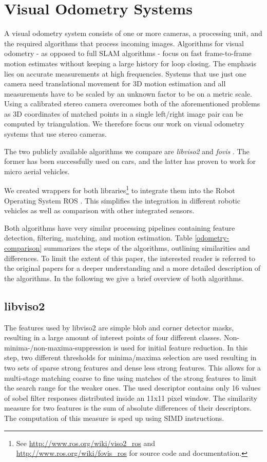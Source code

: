 \documentclass[conference]{IEEEtran}
\begin{document}
\section{Visual Odometry Systems
  \label{visual-odometry-systems}
}
A visual odometry system consists of one or more cameras, a processing unit, and the required algorithms that process incoming images.
Algorithms for visual odometry - as opposed to full SLAM algorithms - focus on fast frame-to-frame motion estimates without keeping a large history for loop closing. The emphasis lies on accurate measurements at high frequencies. Systems that use just one camera need translational movement for 3D motion estimation and all measurements have to be scaled by an unknown factor to be on a metric scale. Using a calibrated stereo camera overcomes both of the aforementioned problems as 3D coordinates of matched points in a single left/right image pair can be computed by triangulation. We therefore focus our work on visual odometry systems that use stereo cameras.

The two publicly available algorithms we compare are \emph{libviso2} \cite{Geiger2011} and \emph{fovis} \cite{Huang2011}. The former has been successfully used on cars, and the latter has proven to work for micro aerial vehicles.

We created wrappers for both libraries\footnote{See \url{http://www.ros.org/wiki/viso2_ros} and \url{http://www.ros.org/wiki/fovis_ros} for source code and documentation.} to integrate them into the Robot Operating System ROS \cite{Quigley2009}. This simplifies the integration in different robotic vehicles as well as comparison with other integrated sensors.


Both algorithms have very similar processing pipelines containing feature detection, filtering, matching, and motion estimation. Table \ref{odometry-comparison} summarizes the steps of the algorithms, outlining similarities and differences. To limit the extent of this paper, the interested reader is referred to the original papers for a deeper understanding and a more detailed description of the algorithms. In the following we give a brief overview of both algorithms.

\subsection{libviso2
  \label{libviso2}
}

The features used by libviso2 are simple blob and corner detector masks, resulting in a large amount of interest points of four different classes. Non-minima-/non-maxima-suppression is used for initial feature reduction. In this step, two different thresholds for minima/maxima selection are used resulting in two sets of sparse strong features and dense less strong features. This allows for a multi-stage matching coarse to fine using matches of the strong features to limit the search range for the weaker ones. The used descriptor contains only 16 values of sobel filter responses distributed inside an 11x11 pixel window. The similarity measure for two features is the sum of absolute differences of their descriptors. The computation of this measure is sped up using SIMD instructions.
\end{document}
